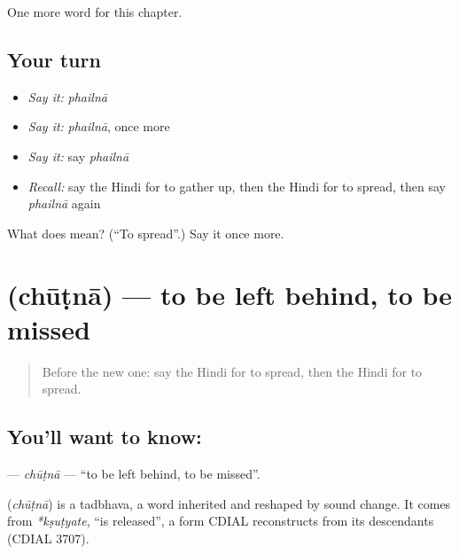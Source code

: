 \begin{grammarlens}[title={What you've built}]
One more word for this chapter.
\end{grammarlens}

\subsection*{Your turn}
\begin{itemize}
\raggedright
  \item \emph{Say it:} \emph{phailnā}
  \item \emph{Say it:} \emph{phailnā}, once more
  \item \emph{Say it:} say \emph{phailnā}
  \item \emph{Recall:} say the Hindi for to gather up, then the Hindi for to spread, then say \emph{phailnā} again
\end{itemize}

\begin{tcolorbox}[breakable,colback=teal!4,colframe=teal!35!black,title={Before you move on}]
What does  mean? (\textquotedblleft{}To spread\textquotedblright{}.) Say it once more.
\end{tcolorbox}
\section[\texorpdfstring{\hi{छूटना} (chūṭnā)}{छूटना (chūṭnā)}]{ (chūṭnā) — to be left behind, to be missed}

\label{lesson:HI-C229-chutna}



\begin{quote}
Before the new one: say the Hindi for to spread, then the Hindi for to spread.
\end{quote}

\subsection*{You'll want to know: }
\textbf{} — \emph{chūṭnā} — \textquotedblleft{}to be left behind, to be missed\textquotedblright{}.

\begin{cousinweb}
\textbf{} (\emph{chūṭnā}) is a tadbhava, a word inherited and reshaped by sound change. It comes from \emph{*kṣuṭyate}, \textquotedblleft{}is released\textquotedblright{}, a form CDIAL reconstructs from its descendants (CDIAL 3707).
\end{cousinweb}

